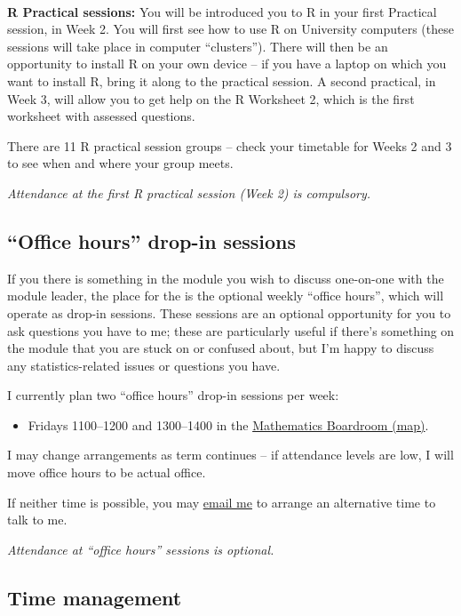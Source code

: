 \documentclass[
  a4paper,
]{book}
\providecommand{\tightlist}{%
  \setlength{\itemsep}{0pt}\setlength{\parskip}{0pt}}
\theoremstyle{definition}
\theoremstyle{definition}
\theoremstyle{definition}
\theoremstyle{definition}
\theoremstyle{remark}
\begin{document}
~

\textbf{R Practical sessions:} You will be introduced you to R in your first Practical session, in Week 2. You will first see how to use R on University computers (these sessions will take place in computer ``clusters''). There will then be an opportunity to install R on your own device -- if you have a laptop on which you want to install R, bring it along to the practical session. A second practical, in Week 3, will allow you to get help on the R Worksheet 2, which is the first worksheet with assessed questions.

There are 11 R practical session groups -- check your timetable for Weeks 2 and 3 to see when and where your group meets.

\emph{Attendance at the first R practical session (Week 2) is compulsory.}

\hypertarget{dropin}{%
\subsection*{``Office hours'' drop-in sessions}\label{dropin}}

If you there is something in the module you wish to discuss one-on-one with the module leader, the place for the is the optional weekly ``office hours'', which will operate as drop-in sessions. These sessions are an optional opportunity for you to ask questions you have to me; these are particularly useful if there's something on the module that you are stuck on or confused about, but I'm happy to discuss any statistics-related issues or questions you have.

I currently plan two ``office hours'' drop-in sessions per week:

\begin{itemize}
\tightlist
\item
  Fridays 1100--1200 and 1300--1400 in the \href{boardroom.png}{Mathematics Boardroom (map)}.
\end{itemize}

I may change arrangements as term continues -- if attendance levels are low, I will move office hours to be actual office.

If neither time is possible, you may \href{mailto:m.aldridge@leeds.ac.uk}{email me} to arrange an alternative time to talk to me.

\emph{Attendance at ``office hours'' sessions is optional.}

\hypertarget{time}{%
\subsection*{Time management}\label{time}}
\end{document}
